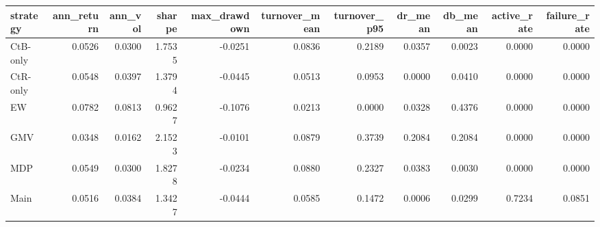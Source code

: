 \begin{tabular}{lrrrrrrrrrr}
\toprule
strategy & ann_return & ann_vol & sharpe & max_drawdown & turnover_mean & turnover_p95 & dr_mean & db_mean & active_rate & failure_rate \\
\midrule
CtB-only & 0.0526 & 0.0300 & 1.7535 & -0.0251 & 0.0836 & 0.2189 & 0.0357 & 0.0023 & 0.0000 & 0.0000 \\
CtR-only & 0.0548 & 0.0397 & 1.3794 & -0.0445 & 0.0513 & 0.0953 & 0.0000 & 0.0410 & 0.0000 & 0.0000 \\
EW & 0.0782 & 0.0813 & 0.9627 & -0.1076 & 0.0213 & 0.0000 & 0.0328 & 0.4376 & 0.0000 & 0.0000 \\
GMV & 0.0348 & 0.0162 & 2.1523 & -0.0101 & 0.0879 & 0.3739 & 0.2084 & 0.2084 & 0.0000 & 0.0000 \\
MDP & 0.0549 & 0.0300 & 1.8278 & -0.0234 & 0.0880 & 0.2327 & 0.0383 & 0.0030 & 0.0000 & 0.0000 \\
Main & 0.0516 & 0.0384 & 1.3427 & -0.0444 & 0.0585 & 0.1472 & 0.0006 & 0.0299 & 0.7234 & 0.0851 \\
\bottomrule
\end{tabular}
